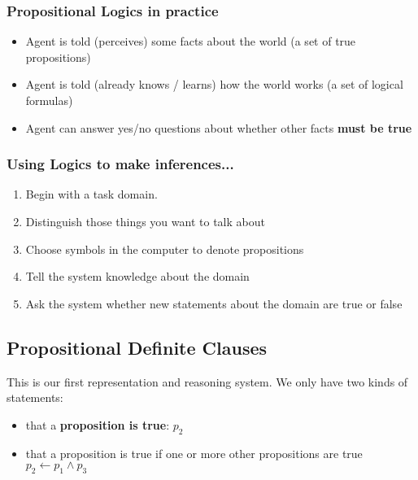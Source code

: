 \documentclass{article}
\def\blu#1{{\color{blu}#1}}
\def\gre#1{{\color{gre}#1}}
\begin{document}
\subsubsection*{Propositional Logics in practice}
\begin{itemize}
	\item Agent is told (perceives) some facts about the world (\blu{a set of true propositions})
	\item Agent is told (already knows / learns) how the world works ({\color{Fuchsia}a set of logical formulas})
	\item Agent can answer \gre{yes/no questions} about whether other facts \textbf{\blu{must be true}}
\end{itemize}
\subsubsection*{Using Logics to make inferences...}
\begin{enumerate}
	\item  Begin with a task domain.
	\item Distinguish those things you want to talk about
	\item Choose symbols in the computer to denote propositions
	\item Tell the system knowledge about the domain
	\item Ask the system whether new statements about the domain are true or false
\end{enumerate}

\subsection*{Propositional Definite Clauses}
This is our first representation and reasoning system. We only have two kinds of statements:
\begin{itemize}
	\item that a \textbf{proposition is true}: $ p_2 $
	\item that a proposition is true if one or more other propositions are true $ p_2 \leftarrow p_1 \land p_3 $
\end{itemize}
\end{document}
